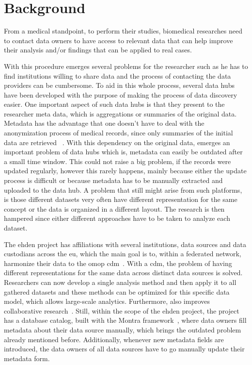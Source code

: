 \chapter{Background}
\label{chapter:background}

From a medical standpoint, to perform their studies, biomedical researches need to
contact data owners to have access to relevant data that can help improve their
analysis and/or findings that can be applied to real cases.


With this procedure emerges several problems for the researcher such as he has to find
institutions willing to share data and the process of contacting the data providers can
be cumbersome.
To aid in this whole process, several data hubs have been developed with the purpose of
making the process of data discovery easier.
One important aspect of such data hubs is that they present to the researcher meta
data, which is aggregations or summaries of the original data.
Metadata has the advantage that one doesn't have to deal with the anonymization process
of medical records, since only summaries of the initial data are retrieved
~\cite{egenvar, montra}.
With this dependency on the original data, emerges an important problem of data hubs
which is, metadata can easily be outdated after a small time window.
This could not raise a big problem, if the records were updated regularly, however this
rarely happens, mainly because either the update process is difficult or because
metadata has to be manually extracted and uploaded to the data hub.
A problem that still might arise from such platforms, is those different datasets very
often have different representation for the same concept or the data is organized in a
different layout.
The research is then hampered since either different approaches have to be taken to
analyze each dataset.


The \gls{ehden} project has affiliations with several institutions, data sources and
data custodians across the \gls{eu}, which the main goal is to, within a federated
network, harmonize their data to the \gls{omop} \gls{cdm}~\cite{ehden-datapartners}.
With a \gls{cdm}, the problem of having different representations for the same data
across distinct data sources is solved.
Researchers can now develop a single analysis method and then apply it to all gathered
datasets and these methods can be optimized for this specific data model, which allows
large-scale analytics.
Furthermore, also improves collaborative research~\cite{ohdsi-site}.
Still, within the scope of the \gls{ehden} project, the project has a database catalog,
built with the Montra framework~\cite{montra}, where data owners fill metadata about
their data source manually, which brings the outdated problem already mentioned before.
Additionally, whenever new metadata fields are introduced, the data owners of all data
sources have to go manually update their metadata form.


